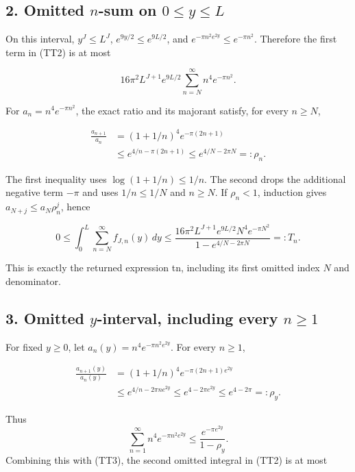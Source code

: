 \subsection{\texorpdfstring{2. Omitted \(n\)-sum on \(0\le y\le L\)}{2. Omitted n-sum on 0\textbackslash le y\textbackslash le L}}\label{C47stage:TT:omitted-n-sum-on-0le-yle-l}

On this interval, \(y^J\le L^J\), \(e^{9y/2}\le e^{9L/2}\), and \(e^{-\pi n^2e^{2y}}\le e^{-\pi n^2}\). Therefore the first term in (TT2) is at most

\[
16\pi^2L^{J+1}e^{9L/2}
\sum_{n=N}^\infty n^4e^{-\pi n^2}.
\tag{TT4}
\]

For \(a_n=n^4e^{-\pi n^2}\), the exact ratio and its majorant satisfy, for every \(n\ge N\),

\[
\begin{aligned}
\frac{a_{n+1}}{a_n}
&=(1+1/n)^4e^{-\pi(2n+1)}\\
&\le e^{4/n-\pi(2n+1)}
\le e^{4/N-2\pi N}=:\rho_n.
\end{aligned}
\tag{TT5}
\]

The first inequality uses \(\log(1+1/n)\le1/n\). The second drops the additional negative term \(-\pi\) and uses \(1/n\le1/N\) and \(n\ge N\). If \(\rho_n<1\), induction gives \(a_{N+j}\le a_N\rho_n^j\), hence

\[
\boxed{
0\le\int_0^L\sum_{n=N}^{\infty}f_{J,n}(y)\,dy
\le
\frac{16\pi^2L^{J+1}e^{9L/2}N^4e^{-\pi N^2}}
{1-e^{4/N-2\pi N}}
=:T_n.}
\tag{TT6}
\]

This is exactly the returned expression tn, including its first omitted index \(N\) and denominator.

\subsection{\texorpdfstring{3. Omitted \(y\)-interval, including every \(n\ge1\)}{3. Omitted y-interval, including every n\textbackslash ge1}}\label{C47stage:TT:omitted-y-interval-including-every-nge1}

For fixed \(y\ge0\), let \(a_n(y)=n^4e^{-\pi n^2e^{2y}}\). For every \(n\ge1\),

\[
\begin{aligned}
\frac{a_{n+1}(y)}{a_n(y)}
&=(1+1/n)^4e^{-\pi(2n+1)e^{2y}}\\
&\le e^{4/n-2\pi n e^{2y}}
\le e^{4-2\pi e^{2y}}
\le e^{4-2\pi}=:\rho_y.
\end{aligned}
\tag{TT7}
\]

Thus \[
\sum_{n=1}^{\infty}n^4e^{-\pi n^2e^{2y}}
\le \frac{e^{-\pi e^{2y}}}{1-\rho_y}.
\] Combining this with (TT3), the second omitted integral in (TT2) is at most

